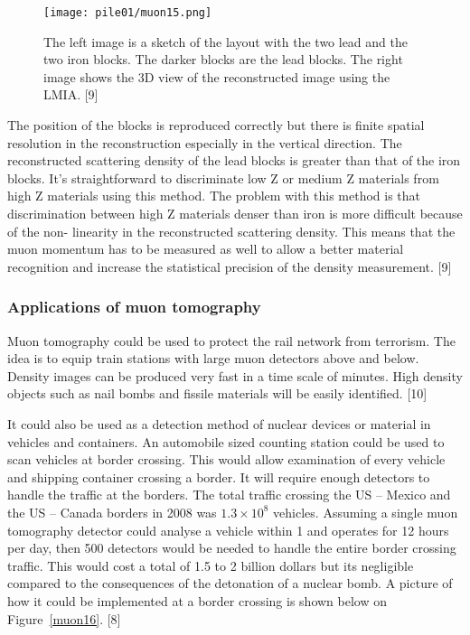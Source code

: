 \documentclass[a4paper]{article}
\begin{document}
\begin{figure}[h!]
  \texttt{[image: pile01/muon15.png]}
  \caption{The left image is a sketch of the layout with the two lead and the two iron blocks. The
darker blocks are the lead blocks. The right image shows the 3D view of the reconstructed image
using the LMIA. [9]}
  \label{muon15}
\end{figure}

The position of the blocks is reproduced correctly but there is finite spatial resolution in the
reconstruction especially in the vertical direction. The reconstructed scattering density of the lead
blocks is greater than that of the iron blocks. It’s straightforward to discriminate low Z or medium Z
materials from high Z materials using this method. The problem with this method is that
discrimination between high Z materials denser than iron is more difficult because of the non-
linearity in the reconstructed scattering density. This means that the muon momentum has to be
measured as well to allow a better material recognition and increase the statistical precision of the
density measurement. [9]

\subsubsection{Applications of muon tomography}
Muon tomography could be used to protect the rail network from terrorism. The idea is to equip
train stations with large muon detectors above and below. Density images can be produced very fast
in a time scale of minutes. High density objects such as nail bombs and fissile materials will be easily
identified. [10]

It could also be used as a detection method of nuclear devices or material in vehicles and containers.
An automobile sized counting station could be used to scan vehicles at border crossing. This would
allow examination of every vehicle and shipping container crossing a border. It will require enough
detectors to handle the traffic at the borders. The total traffic crossing the US -- Mexico and the US --
Canada borders in 2008 was \(1.3\times10^8\) vehicles. Assuming a single muon tomography detector could
analyse a vehicle within \unit{1}{\minute} and operates for 12 hours per day, then 500 detectors would be
needed to handle the entire border crossing traffic. This would cost a total of 1.5 to 2 billion dollars
but its negligible compared to the consequences of the detonation of a nuclear bomb. A picture of
how it could be implemented at a border crossing is shown below on Figure~\ref{muon16}. [8]
\end{document}
